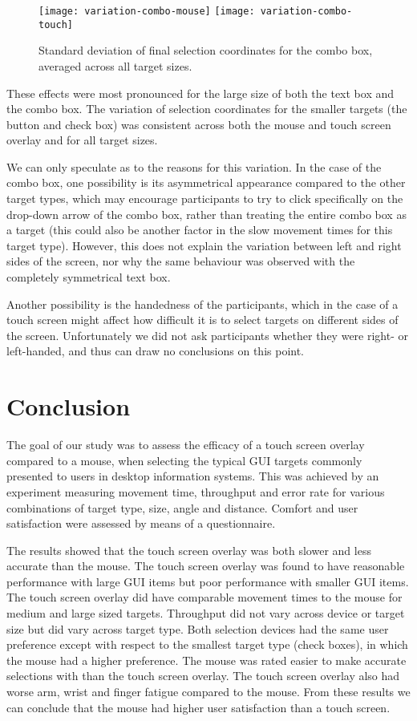\documentclass[a4paper]{article}
\begin{document}
\begin{figure}
	\centering
	\texttt{[image: variation-combo-mouse]}
	\texttt{[image: variation-combo-touch]}
	\caption{Standard deviation of final selection coordinates for the
	combo box, averaged across all target sizes.}
	\label{fig-variation-combobox}
\end{figure}


These effects were most pronounced for the large size of both the text
box and the combo box. The variation of selection coordinates for the
smaller targets (the button and check box) was consistent across both
the mouse and touch screen overlay and for all target sizes.

We can only speculate as to the reasons for this variation. In the case
of the combo box, one possibility is its asymmetrical appearance
compared to the other target types, which may encourage participants to
try to click specifically on the drop-down arrow of the combo box,
rather than treating the entire combo box as a target (this could also
be another factor in the slow movement times for this target type).
However, this does not explain the variation between left and right
sides of the screen, nor why the same behaviour was observed with the
completely symmetrical text box.

Another possibility is the handedness of the participants, which in the
case of a touch screen might affect how difficult it is to select
targets on different sides of the screen. Unfortunately we did not ask
participants whether they were right- or left-handed, and thus can draw
no conclusions on this point.


\section{Conclusion}
\label{sec-conclusions}

The goal of our study was to assess the efficacy of a touch screen
overlay compared to a mouse, when selecting the typical GUI targets
commonly presented to users in desktop information systems. This was
achieved by an experiment measuring movement time, throughput and error
rate for various combinations of target type, size, angle and distance.
Comfort and user satisfaction were assessed by means of a questionnaire.

The results showed that the touch screen overlay was both slower and
less accurate than the mouse. The touch screen overlay was found to have
reasonable performance with large GUI items but poor performance with
smaller GUI items. The touch screen overlay did have comparable movement
times to the mouse for medium and large sized targets. Throughput did
not vary across device or target size but did vary across target type.
Both selection devices had the same user preference except with respect
to the smallest target type (check boxes), in which the mouse had a
higher preference. The mouse was rated easier to make accurate
selections with than the touch screen overlay. The touch screen overlay
also had worse arm, wrist and finger fatigue compared to the mouse. From
these results we can conclude that the mouse had higher user
satisfaction than a touch screen.
\end{document}
